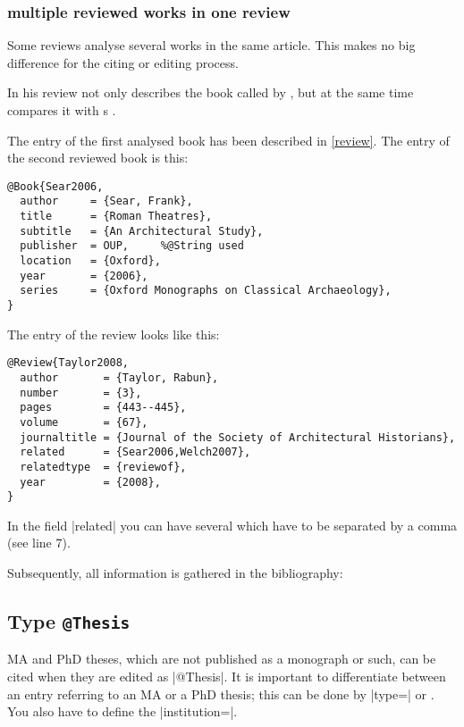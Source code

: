 \documentclass[a4paper,
10pt,
greek,
french,
spanish,
italian,
ngerman,
english
]{ltxdoc}
\begin{document}


\subsubsection{multiple reviewed works in one review}
Some reviews analyse several works in the same article. 
This makes no big difference for the citing or editing process.

In his review
\citeauthor{Taylor2008} not only describes the book called
  by \citeauthor{Welch2007}, 
 but at the same time compares it with \citeauthor{Sear2006}s .

The entry of the first analysed book  has been described in \cref{review}.
The entry of the second reviewed book is this:
\begin{lstlisting}[style=bibentry,label=Sear2006,caption={{@}Book\{Sear2006,…\} }]
@Book{Sear2006,
  author     = {Sear, Frank},
  title      = {Roman Theatres},
  subtitle   = {An Architectural Study},
  publisher  = OUP,		%@String used
  location   = {Oxford},
  year       = {2006},
  series     = {Oxford Monographs on Classical Archaeology},
}
\end{lstlisting}

The entry of the review looks like this:
\begin{lstlisting}[style=bibentry,label=Taylor2008,caption={{@}Review\{Taylor2008,…\} }]
@Review{Taylor2008,
  author       = {Taylor, Rabun},
  number       = {3},
  pages        = {443--445},
  volume       = {67},
  journaltitle = {Journal of the Society of Architectural Historians},
  related      = {Sear2006,Welch2007},
  relatedtype  = {reviewof},
  year         = {2008},
}
\end{lstlisting}
In the field |related| you can have several  which have to be separated by a comma (see line 7).

Subsequently, all information is gathered in the bibliography:


 \subsection{Type \texttt{@Thesis}}\label{thesis}
MA and PhD theses, which are not published as a monograph or such, can be cited when they are edited as |@Thesis|.
It is important to differentiate between an entry referring to an MA or a PhD thesis;
this can be done by |type=| or
 . 
You also have to define the  |institution=|.
 
\end{document}
